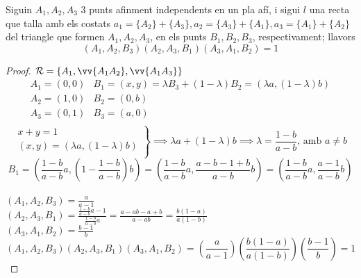 \begin{thm}[de Menelao]
	Siguin $A_1,A_2,A_3$ 3 punts afinment independents en un pla afí, i sigui $l$ una recta que talla amb els costats $a_1=\{A_2\}+\{A_3\},a_2=\{A_3\}+\{A_1\},a_3=\{A_1\}+\{A_2\}$ del triangle que formen $A_1,A_2,A_3$, en els punts $B_1,B_2,B_3$, respectivament; llavors
	\[(A_1,A_2,B_3)(A_2,A_3,B_1)(A_3,A_1,B_2)=1\]
\end{thm}
\begin{proof}
	$\mathcal{R}=\{A_1,\vv{A_1A_2},\vv{A_1A_3}\}$ \\
	\[\begin{array}{ll}
		A_1=(0,0) & B_1=(x,y)=\lambda B_3+(1-\lambda )B_2=(\lambda a,(1-\lambda )b) \\
		A_2=(1,0) & B_2=(0,b) \\
		A_3=(0,1) & B_3=(a,0) \\
	\end{array}\]
	\[\left.\begin{array}{l}
		x+y=1 \\
		(x,y)=(\lambda a,(1-\lambda )b) \\
	\end{array}\right\}\implies\lambda a+(1-\lambda )b\implies\lambda =\frac{1-b}{a-b}\text{, amb }a\neq b\]
	\[B_1=\left(\frac{1-b}{a-b}a,\left(1-\frac{1-b}{a-b}\right)b\right)=\left(\frac{1-b}{a-b}a,\frac{a-b-1+b}{a-b}b\right)=\left(\frac{1-b}{a-b}a,\frac{a-1}{a-b}b\right)\] \\
	$\displaystyle{(A_1,A_2,B_3)=\frac{a}{a-1}}$ \\
	$\displaystyle{(A_2,A_3,B_1)=\frac{\frac{1-b}{a-b}a-1}{\frac{1-b}{a-b}a}=\frac{a-ab-a+b}{a-ab}=\frac{b(1-a)}{a(1-b)}}$ \\
	$\displaystyle{(A_3,A_1,B_2)=\frac{b-1}{b}}$ \\
	\[(A_1,A_2,B_3)(A_2,A_3,B_1)(A_3,A_1,B_2)=\left(\frac{a}{a-1}\right)\left(\frac{b(1-a)}{a(1-b)}\right)\left(\frac{b-1}{b}\right)=1\]
\end{proof}

